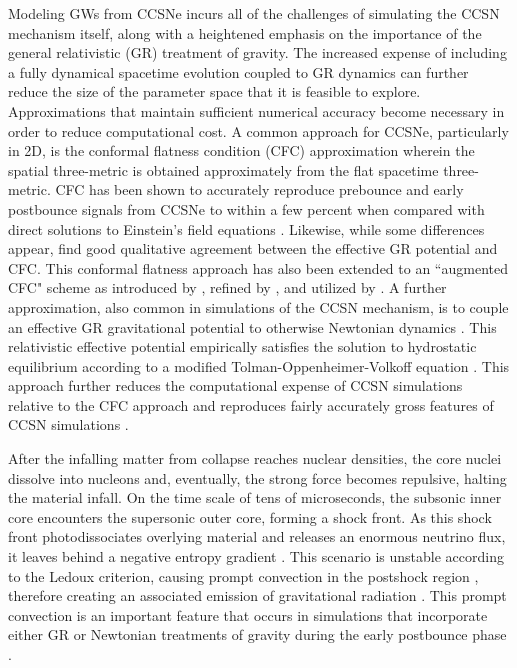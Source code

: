 \documentclass[twocolumn,times]{aastex62}  %
\begin{document}
Modeling GWs from CCSNe incurs all of the challenges of simulating the CCSN mechanism itself, along with a heightened emphasis on the importance of the general relativistic (GR) treatment of gravity. 
The increased expense of including a fully dynamical spacetime evolution coupled to GR dynamics \citep[see][]{ott:2009, ott:2012} can further reduce the size of the parameter space that it is feasible to explore. 
Approximations that maintain sufficient numerical accuracy become necessary in order to reduce computational cost.  
A common approach for CCSNe, particularly in 2D, is the conformal flatness condition (CFC) approximation wherein the spatial three-metric is obtained approximately from the flat spacetime three-metric.
CFC has been shown to accurately reproduce prebounce and early postbounce signals from CCSNe to within a few percent when compared with direct solutions to Einstein's field equations  \citep{ott:2007}.  Likewise, while some differences appear, \citet{shibata:2004} find good qualitative agreement between the effective GR potential and CFC.  This conformal flatness approach has also been extended to an ``augmented CFC" scheme as introduced by \citet{saijo:2004}, refined by \citet{cordero-carrion:2009}, and utilized by \citet{bmuller:2019}.
A further approximation, also common in simulations of the CCSN mechanism, is to couple an effective GR gravitational potential to otherwise Newtonian dynamics \citep{rampp:2002, marek:2006, bruenn:2016,  morozova:2018, oconnor:2018}.  
This relativistic effective potential empirically satisfies the solution to hydrostatic equilibrium according to a modified Tolman-Oppenheimer-Volkoff equation \citep{rampp:2002, marek:2006}.
This approach further reduces the computational expense of CCSN simulations relative to the CFC approach and reproduces fairly accurately gross features of CCSN simulations \citep{marek:2006, muller:2012,oconnor:2018}.  

After the infalling matter from collapse reaches nuclear densities, the core nuclei dissolve into nucleons and, eventually, the strong force becomes repulsive, halting the material infall.  On the time scale of tens of microseconds, the subsonic inner core encounters the supersonic outer core, forming a shock front.  As this shock front photodissociates overlying material and releases an enormous neutrino flux, it leaves behind a negative entropy gradient \citep{mazurek:1982,bruenn:1985,bruenn:1989}.  This scenario is unstable according to the Ledoux criterion, causing prompt convection in the postshock region \citep{burrows:1992}, therefore creating an associated emission of gravitational radiation \citep{marek:2009b,ott:2009}.  This prompt convection is an important feature that occurs in simulations that incorporate either GR or Newtonian treatments of gravity during the early postbounce phase \citep{muller:2017,richers:2017,nagakura:2018}.
\end{document}
